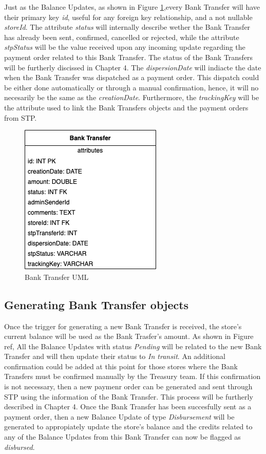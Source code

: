 Just as the Balance Updates, as shown in Figure \ref{fig:uml_bank_transfers},every Bank Transfer will have their primary key \textit{id}, useful for any foreign key relationship, and a not nullable \textit{storeId}. The attribute \textit{status} will internally describe wether the Bank Transfer has already been sent, confirmed, cancelled or rejected, while the attribute \textit{stpStatus} will be the value received upon any incoming update regarding the payment order related to this Bank Transfer. The status of the Bank Transfers will be furtherly discissed in Chapter 4. The \textit{dispersionDate} will indiacte the date when the Bank Transfer was dispatched as a payment order. This dispatch could be either done automatically or through a manual confirmation, hence, it will no necesarily be the same as the \textit{creationDate}. Furthermore, the \textit{trackingKey} will be the attribute used to link the Bank Transfers objects and the payment orders from STP.

\begin{figure} [H]
    \centering
    \includegraphics[scale = 0.7]{assets/uml/BankTransfers.png}
    \caption{Bank Transfer UML}\label{fig:uml_bank_transfers}
\end{figure}

\subsection{Generating Bank Transfer objects}

Once the trigger for generating a new Bank Transfer is received, the store's current balance will be used as the Bank Trasfer's amount. As shown in Figure ref{}, All the Balance Updates with status \textit{Pending} will be related to the new Bank Transfer and will then update their status to \textit{In transit}. An additional confirmation could be added at this point for those stores where the Bank Transfers must be confirmed manually by the Treasury team. If this confirmation is not necessary, then a new paymenr order can be generated and sent through STP using the information of the Bank Transfer. This process will be furtherly described in Chapter 4. Once the Bank Transfer has been succesfully sent as a payment order, then a new Balance Update of type \textit{Disbursement} will be generated to appropiately update the store's balance and the credits related to any of the Balance Updates from this Bank Transfer can now be flagged as \textit{disbursed}.\\

